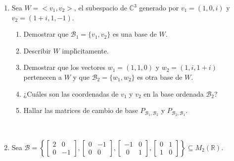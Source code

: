 \documentclass[12pt]{amsart}
\begin{document}
\begin{enumerate}
\begin{enumerate}
	\item Demostrar que
	$\mathcal{B}$ es una base de $M_{2\times3}(\mathbb{R})$.
	\item Hallar las coordenadas de
	$
	\begin{bmatrix}
	1 & 1& 1 \\
	1 & 1& 1
	\end{bmatrix}$ con respecto a la base $\mathcal{B}$.
	\item Hallar las matrices de cambio de base de la base can\'onica
	a $\mathcal{B}$ y viceversa.
\end{enumerate}

\

\item Sea $W=<v_1,v_2>$, el subespacio de $\mathbb{C}^3$
generado por $v_1=(1,0,i)$ y $v_2=(1+i,1,-1)$.
\begin{enumerate}
	\item Demostrar que $\mathcal{B}_1=\{v_1,v_2\}$ es una base de $W$.
	\item Describir $W$ impl{\'\i}citamente.
	\item Demostrar que los vectores $w_1=(1,1,0)$ y
	$w_2=(1,i,1+i)$ pertenecen a $W$ y que $\mathcal{B}_2=\{w_1,w_2\}$
	es otra base de $W$.
	\item  ¿Cu{\'a}les son las coordenadas de $v_1$ y $v_2$ en la
	base ordenada $\mathcal{B}_2$?
	\item Hallar las matrices de cambio de base
	$P_{\mathcal{B}_1,\mathcal{B}_2}$ y $P_{\mathcal{B}_2,\mathcal{B}_1}$.
\end{enumerate}

\

\item Sea $\mathcal{B}=
\left\{
\begin{bmatrix}
2 & 0\\
0 & -1
\end{bmatrix},
\begin{bmatrix}
0& -1\\
0& 0
\end{bmatrix},
\begin{bmatrix}
-1 &0\\
\; 0 & 1
\end{bmatrix},
\begin{bmatrix}
0 &1 \\
1 &0
\end{bmatrix}
\right\} \subseteq M_2(\mathbb R)$.


\



\end{enumerate}
\end{document}
